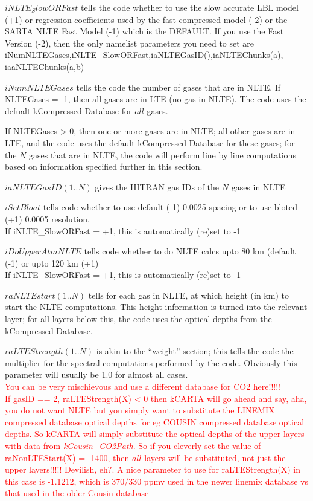 \documentclass[12pt]{article}
\newcommand{\kc}{\textsf{kCARTA}\xspace}
\begin{document}
{{\noindent $iNLTE_SlowORFast$ tells the code whether to use the slow
accurate LBL model (+1) or regression coefficients used by the fast
compressed model (-2) or the SARTA NLTE Fast Model (-1) which is the DEFAULT. If
you use the Fast Version (-2), then the only namelist parameters you
need to set are iNumNLTEGases,iNLTE\_SlowORFast,iaNLTEGasID(),iaNLTEChunks(a),
iaaNLTEChunks(a,b)

\noindent $iNumNLTEGases$ tells the code the number of gases that are in NLTE.
If NLTEGases = -1, then all gases are in LTE (no gas in NLTE). The code uses 
the defualt kCompressed Database for $all$ gases.

If NLTEGases > 0, then one or more gases are in NLTE; all other gases are in 
LTE, and the code uses the default kCompressed Database for these gases; for 
the $N$ gases that are in NLTE, the code will perform line by line computations
based on information specified further in this section.

\noindent $iaNLTEGasID(1..N)$ gives the HITRAN gas IDs of the $N$ gases in NLTE

\noindent $iSetBloat$ tells code whether to use default (-1) 0.0025 \wn 
spacing or to use bloted (+1) 0.0005 \wn resolution.\\
If iNLTE\_SlowORFast = +1, this is automatically (re)set to -1

\noindent $iDoUpperAtmNLTE$ tells code whether to do NLTE calcs upto 80 km 
(default (-1) or upto 120 km (+1)\\
If iNLTE\_SlowORFast = +1, this is automatically (re)set to -1

\noindent $raNLTEstart(1..N)$ tells for each gas in NLTE, at which height 
(in km) to start the NLTE computations. This height information is turned into
the relevant layer; for all layers below this, the code 
uses the optical depths from the kCompressed Database.

\noindent $raLTEStrength(1..N)$ is akin to the ``weight'' section; this tells 
the code the multiplier for the spectral computations performed by the code.
Obviously this parameter will usually be 1.0 for almost all cases.\\
\textcolor{red}
{You can be very mischievous and use a different database for CO2 here!!!!! \\
If gasID == 2, raLTEStrength(X) < 0 then kCARTA will go ahead and say, aha, 
you do not want NLTE but you simply want to substitute the LINEMIX compressed
database optical depths for eg COUSIN compressed database optical depths. So
\kc will simply substitute the optical depths of the upper layers with 
data from \emph{kCousin\_CO2Path}. So if you cleverly set the value of 
raNonLTEStart(X) = -1400, then $all$ layers will be substituted, not just the 
upper layers!!!!! Devilish, eh?. A nice parameter to use for raLTEStrength(X)
in this case is -1.1212, which is 370/330 ppmv used in the newer linemix
database vs that used in the older Cousin database}

}}
\end{document}
